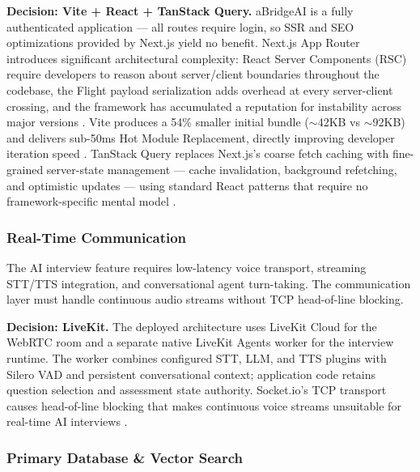 \textbf{Decision: Vite + React + TanStack Query.} aBridgeAI is a fully authenticated application — all routes require login, so SSR and SEO optimizations provided by Next.js yield no benefit. Next.js App Router introduces significant architectural complexity: React Server Components (RSC) require developers to reason about server/client boundaries throughout the codebase, the Flight payload serialization adds overhead at every server-client crossing, and the framework has accumulated a reputation for instability across major versions \cite{northflank2024nextjs, appwrite2024tanstack}. Vite produces a 54\% smaller initial bundle ($\sim$42KB vs $\sim$92KB) and delivers sub-50ms Hot Module Replacement, directly improving developer iteration speed \cite{techsy2026vite, hygraph2024vite}. TanStack Query replaces Next.js's coarse fetch caching with fine-grained server-state management — cache invalidation, background refetching, and optimistic updates — using standard React patterns that require no framework-specific mental model \cite{tanstack2024comparison}.

\subsubsection{Real-Time Communication}

The AI interview feature requires low-latency voice transport, streaming STT/TTS integration, and conversational agent turn-taking. The communication layer must handle continuous audio streams without TCP head-of-line blocking.


\textbf{Decision: LiveKit.} The deployed architecture uses LiveKit Cloud for the WebRTC room and a separate native LiveKit Agents worker for the interview runtime. The worker combines configured STT, LLM, and TTS plugins with Silero VAD and persistent conversational context; application code retains question selection and assessment state authority. Socket.io's TCP transport causes head-of-line blocking that makes continuous voice streams unsuitable for real-time AI interviews \cite{versatik2025webrtc}.

\subsubsection{Primary Database \& Vector Search}


